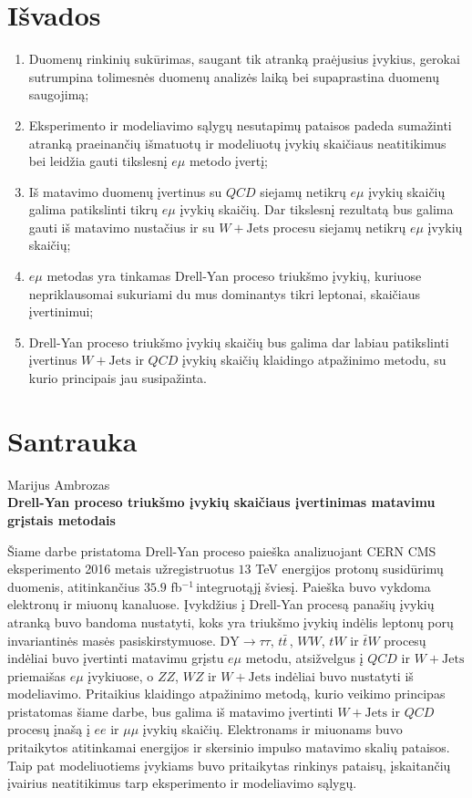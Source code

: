 \documentclass[a4paper, 12pt, oneside]{article}
\newcommand{\ZZ}{Z\! Z}
\newcommand{\WZ}{W\! Z}
\newcommand{\ttbar}{t\bar{t}}
\newcommand{\emu}{e\mu}
\newcommand{\WJets}{W\! +\!\mathrm{Jets}}
\newcommand{\DYtau}{\mathrm{DY} \! \rightarrow \! \tau\tau}
\newcommand{\invfb}{fb$^{-1}\,$}
\newcommand{\QCD}{QC\! D}
\begin{document}
\section{Išvados}
\begin{enumerate}
	\item Duomenų rinkinių sukūrimas, saugant tik atranką praėjusius įvykius, gerokai sutrumpina tolimesnės duomenų analizės
	laiką bei supaprastina duomenų saugojimą;
	\item Eksperimento ir modeliavimo sąlygų nesutapimų pataisos padeda sumažinti atranką praeinančių išmatuotų ir modeliuotų
	įvykių skaičiaus neatitikimus bei leidžia gauti tikslesnį $\emu$ metodo įvertį;
	\item Iš matavimo duomenų įvertinus su $QCD$ siejamų netikrų $\emu$ įvykių skaičių galima patikslinti tikrų $\emu$ įvykių
	skaičių. Dar tikslesnį rezultatą bus galima gauti iš matavimo nustačius ir su $W+\mathrm{Jets}$ procesu siejamų netikrų
	$\emu$ įvykių skaičių;
	\item $\emu$ metodas yra tinkamas Drell-Yan proceso triukšmo įvykių, kuriuose nepriklausomai sukuriami du mus dominantys
	tikri leptonai, skaičiaus įvertinimui;
	\item Drell-Yan proceso triukšmo įvykių skaičių bus galima dar labiau patikslinti įvertinus $\WJets$ ir $\QCD$ įvykių skaičių
	klaidingo atpažinimo metodu, su kurio principais jau susipažinta.
\end{enumerate}





\section*{Santrauka}
\begin{center}Marijus Ambrozas \\ \textbf{Drell-Yan proceso triukšmo įvykių skaičiaus įvertinimas matavimu grįstais metodais} \end{center}

Šiame darbe pristatoma Drell-Yan proceso paieška analizuojant CERN CMS eksperimento 2016 metais užregistruotus
$13$ TeV energijos protonų susidūrimų duomenis, atitinkančius $35.9$ \invfb integruotąjį šviesį.
Paieška buvo vykdoma elektronų ir miuonų kanaluose.
Įvykdžius į Drell-Yan procesą panašių įvykių atranką buvo bandoma nustatyti, koks yra triukšmo įvykių indėlis
leptonų porų invariantinės masės pasiskirstymuose.
$\DYtau$, $\ttbar\,$, $WW$, $tW$ ir $\bar{t}W$ procesų indėliai buvo įvertinti matavimu grįstu $\emu$ metodu,
atsižvelgus į $\QCD$ ir $\WJets$ priemaišas $\emu$ įvykiuose, o $\ZZ$, $\WZ$ ir $\WJets$ indėliai buvo nustatyti
iš modeliavimo.
Pritaikius klaidingo atpažinimo metodą, kurio veikimo principas pristatomas šiame darbe, bus galima iš matavimo įvertinti
$\WJets$ ir $\QCD$ procesų įnašą į $ee$ ir $\mu\mu$ įvykių skaičių.
Elektronams ir miuonams buvo pritaikytos atitinkamai energijos ir skersinio impulso matavimo skalių pataisos.
Taip pat modeliuotiems įvykiams buvo pritaikytas rinkinys pataisų, įskaitančių įvairius neatitikimus tarp eksperimento
ir modeliavimo sąlygų.
\end{document}

